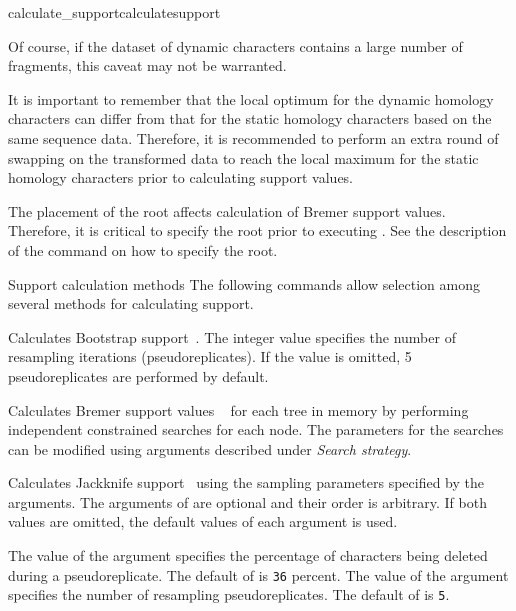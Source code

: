 \begin{command}{calculate\_support}{calculatesupport}
\begin{statement}
\setlength{\parindent}{0.5cm}                
\indent Of course, 
if the dataset of dynamic characters contains a large number of fragments, 
this caveat may not be warranted.

\setlength{\parindent}{0.5cm}                
\indent It is important to remember that the local optimum for the
dynamic homology characters can differ from that for the static
homology characters based on the same sequence data. Therefore, it
is recommended to perform an extra round of swapping on the transformed
data to reach the local maximum for the static homology characters
prior to calculating support values. 
\end{statement}

\begin{statement}
The placement of the root affects calculation of Bremer support values.
Therefore, it is critical to specify the root prior to executing
. See the description of the
command  on how to specify the root.
\end{statement}     

\begin{arguments}
\begin{argumentgroup}{Support calculation methods}
{The following commands allow selection among several methods for
calculating support.} 

{Calculates Bootstrap support~\cite{Felsenstein1985}.  The integer
value specifies the number of resampling iterations (pseudoreplicates).
If the value is omitted, 5 pseudoreplicates are performed by default.}
{}

{Calculates Bremer support values ~\cite{Bremer1988, Kallersjoetal1992}
for each tree in memory by performing independent constrained
searches for each node. The parameters for the searches can be
modified using arguments described under \emph{Search strategy}.}
{}

{Calculates Jackknife support~\cite{Farrisetal1996} using the 
sampling parameters specified by the arguments. The arguments of
 are optional and their order is arbitrary. If
both values are omitted, the default values of each argument is used.}
{}

\begin{description}
{The value of the argument  specifies the
percentage of characters being deleted during a pseudoreplicate. The
default of  is \texttt{36} percent.}
{}
{The value of the argument  specifies the
number of resampling pseudoreplicates. The default of
 is \texttt{5}.}
{}
\end{description} 
\end{argumentgroup}


\end{arguments}
\end{command}
